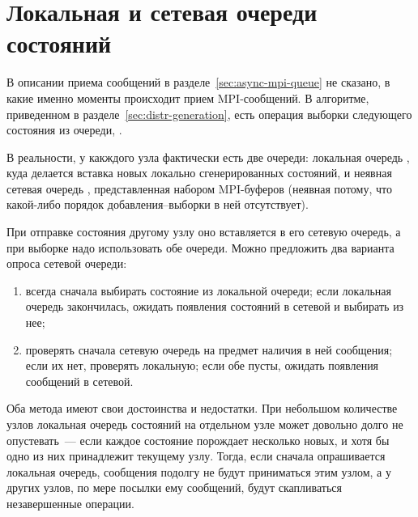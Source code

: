    

\section{Локальная и сетевая очереди состояний}
\label{sec:local-network-queue}

В описании приема сообщений в разделе~\ref{sec:async-mpi-queue} не сказано, в какие именно
моменты происходит прием MPI-сообщений. В алгоритме, приведенном в
разделе~\ref{sec:distr-generation}, есть операция выборки следующего состояния из очереди,
.

В реальности, у какждого узла фактически есть две очереди: локальная очередь
, куда делается вставка новых локально сгенерированных состояний, и
неявная сетевая очередь , представленная набором MPI-буферов (неявная
потому, что какой-либо порядок добавления--выборки в ней отсутствует).

При отправке состояния другому узлу оно вставляется в его сетевую очередь, а при выборке
надо использовать обе очереди. Можно предложить два варианта опроса сетевой очереди:
\begin{enumerate}
\item всегда сначала выбирать состояние из локальной очереди; если локальная очередь
  закончилась, ожидать появления состояний в сетевой и выбирать из нее;
\item проверять сначала сетевую очередь на предмет наличия в ней сообщения; если их нет,
  проверять локальную; если обе пусты, ожидать появления сообщений в сетевой.
\end{enumerate}

Оба метода имеют свои достоинства и недостатки. При небольшом количестве узлов локальная
очередь состояний на отдельном узле может довольно долго не опустевать~--- если каждое
состояние порождает несколько новых, и хотя бы одно из них принадлежит текущему
узлу. Тогда, если сначала опрашивается локальная очередь, сообщения подолгу не будут
приниматься этим узлом, а у других узлов, по мере посылки ему сообщений, будут
скапливаться незавершенные операции.

